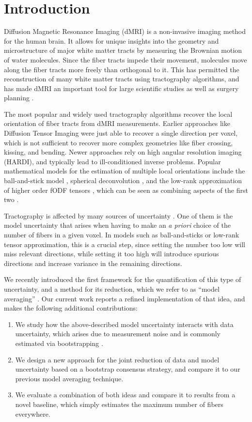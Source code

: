 \section{Introduction}
Diffusion Magnetic Resonance Imaging (dMRI) \cite{LeBihan:1986} is a
non-invasive imaging method for the human brain. It allows for
unique insights into the geometry and microstructure of major white matter tracts by measuring the Brownian motion of water molecules. Since
the fiber tracts impede their movement, molecules move along the fiber tracts
more freely than orthogonal to it. This has permitted the reconstruction of many white matter tracts using tractography algorithms, and has made dMRI an important tool for large
scientific studies \cite{Sotiropoulos:2013, Tobisch:2018Frontiers} as well as surgery planning \cite{Yang:2021}.

The most popular and widely used tractography algorithms recover the local
orientation of fiber tracts from dMRI measurements. Earlier approaches like
Diffusion Tensor Imaging \cite{BASSER1994247}
were just able to recover a single direction per voxel, which is not sufficient
to recover more complex geometries like fiber crossing, kissing, and bending.
Newer approaches rely on high angular resolution imaging (HARDI), and typically lead to ill-conditioned inverse problems. Popular mathematical models for the estimation of multiple local orientations include the
ball-and-stick model \cite{BEHRENS2007144}, spherical deconvolution \cite{TOURNIER20071459}, and the low-rank approximation of higher order fODF tensors
\cite{lowrank}, which can be seen as combining aspects of the first two \cite{Schultz:MICCAI10}.

Tractography is affected by many sources of uncertainty \cite{Schultz:SciVisBook2014}. One of them is the model uncertainty that arises when having to make an \emph{a priori} choice of the number of fibers in a given voxel. In models such as ball-and-sticks or low-rank tensor approximation, this is a
crucial step, since setting the number too low will miss relevant directions, while setting it too high will introduce spurious directions and increase variance in the remaining directions.

We recently introduced the first framework for the quantification of this type of uncertainty, and a method for its reduction, which we refer to as ``model averaging'' \cite{Gruen:2021}. Our current work reports a refined implementation of that idea, and makes the following additional contributions:
\begin{enumerate}
\item We study how the above-described model uncertainty interacts with data uncertainty, which arises due to measurement noise and is commonly estimated via bootstrapping \cite{Chung:2006}.
\item We design a new approach for the joint reduction of data and model uncertainty based on a bootstrap consensus strategy, and compare it to our previous model averaging technique.
\item We evaluate a combination of both ideas and compare it to results from a novel baseline, which simply estimates the maximum number of fibers everywhere.
\end{enumerate}

